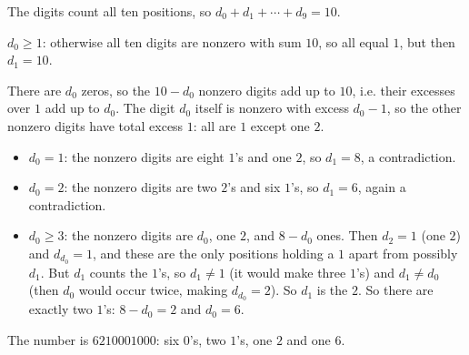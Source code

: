 The digits count all ten positions, so $d_0+d_1+\cdots+d_9=10$.

$d_0\ge1$: otherwise all ten digits are nonzero with sum $10$, so all equal $1$, but then $d_1=10$.

There are $d_0$ zeros, so the $10-d_0$ nonzero digits add up to $10$, i.e. their excesses over $1$ add up to $d_0$. The digit $d_0$ itself is nonzero with excess $d_0-1$, so the other nonzero digits have total excess $1$: all are $1$ except one $2$.
\begin{itemize}
\item $d_0=1$: the nonzero digits are eight $1$'s and one $2$, so $d_1=8$, a contradiction.
\item $d_0=2$: the nonzero digits are two $2$'s and six $1$'s, so $d_1=6$, again a contradiction.
\item $d_0\ge3$: the nonzero digits are $d_0$, one $2$, and $8-d_0$ ones. Then $d_2=1$ (one $2$) and $d_{d_0}=1$, and these are the only positions holding a $1$ apart from possibly $d_1$. But $d_1$ counts the $1$'s, so $d_1\ne1$ (it would make three $1$'s) and $d_1\ne d_0$ (then $d_0$ would occur twice, making $d_{d_0}=2$). So $d_1$ is the $2$. So there are exactly two $1$'s: $8-d_0=2$ and $d_0=6$.
\end{itemize}
The number is $\boxed{6210001000}$: six $0$'s, two $1$'s, one $2$ and one $6$.
